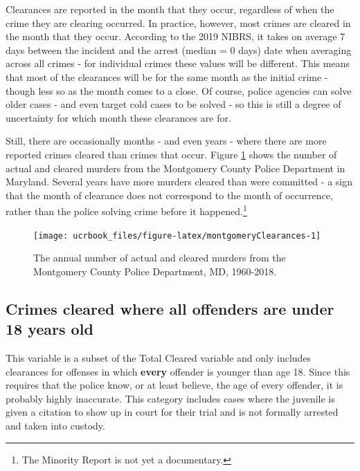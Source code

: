 \documentclass[
  12pt,
  openany]{book}
\begin{document}
Clearances are reported in the month that they occur, regardless of when the crime they are clearing occurred. In practice, however, most crimes are cleared in the month that they occur. According to the 2019 NIBRS, it takes on average 7 days between the incident and the arrest (median = 0 days) date when averaging across all crimes - for individual crimes these values will be different. This means that most of the clearances will be for the same month as the initial crime - though less so as the month comes to a close. Of course, police agencies can solve older cases - and even target cold cases to be solved - so this is still a degree of uncertainty for which month these clearances are for.

Still, there are occasionally months - and even years - where there are more reported crimes cleared than crimes that occur. Figure \ref{fig:montgomeryClearances} shows the number of actual and cleared murders from the Montgomery County Police Department in Maryland. Several years have more murders cleared than were committed - a sign that the month of clearance does not correspond to the month of occurrence, rather than the police solving crime before it happened.\footnote{The Minority Report is not yet a documentary.}

\begin{figure}

{\centering \texttt{[image: ucrbook\_files/figure-latex/montgomeryClearances-1]} 

}

\caption{The annual number of actual and cleared murders from the Montgomery County Police Department, MD, 1960-2018.}\label{fig:montgomeryClearances}
\end{figure}

\hypertarget{crimes-cleared-where-all-offenders-are-under-18-years-old}{%
\subsection{Crimes cleared where all offenders are under 18 years old}\label{crimes-cleared-where-all-offenders-are-under-18-years-old}}

This variable is a subset of the Total Cleared variable and only includes clearances for offenses in which \textbf{every} offender is younger than age 18. Since this requires that the police know, or at least believe, the age of every offender, it is probably highly inaccurate. This category includes cases where the juvenile is given a citation to show up in court for their trial and is not formally arrested and taken into custody.
\end{document}
